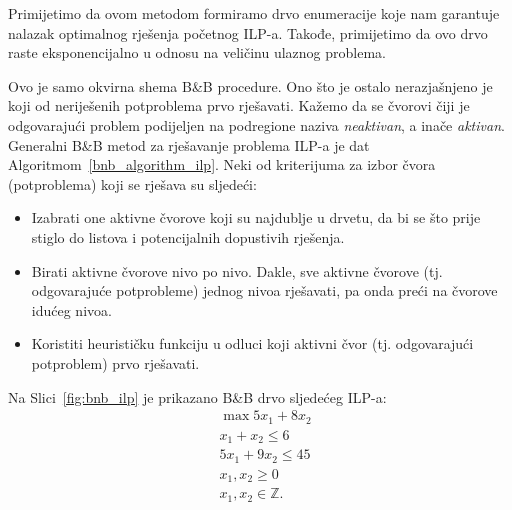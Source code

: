 \documentclass[a4paper, utf8, 11pt, colorlinks]{book}
\begin{document}
Primijetimo da ovom metodom formiramo drvo enumeracije koje nam garantuje nalazak optimalnog rješenja početnog ILP-a. Takođe, primijetimo da ovo drvo raste eksponencijalno u odnosu na veličinu ulaznog problema. 

  Ovo je samo okvirna shema B\&B procedure. Ono što je ostalo nerazjašnjeno je koji od neriješenih potproblema prvo rješavati. Kažemo da se čvorovi čiji je odgovarajući problem podijeljen na podregione naziva \emph{neaktivan}, a inače \emph{aktivan}. Generalni B\&B metod za rješavanje problema ILP-a je dat   Algoritmom~\ref{bnb_algorithm_ilp}.  Neki od kriterijuma za izbor čvora (potproblema) koji se rješava su sljedeći:
  \begin{itemize}
  	\item Izabrati one aktivne čvorove koji su najdublje u drvetu, da bi se što prije stiglo do listova i potencijalnih dopustivih rješenja.
  	\item Birati aktivne čvorove nivo po nivo. Dakle, sve aktivne čvorove (tj. odgovarajuće potprobleme) jednog nivoa   rješavati, pa onda preći na čvorove idućeg nivoa. 
  	\item Koristiti heurističku funkciju u odluci koji aktivni čvor (tj. odgovarajući potproblem) prvo rješavati. 
  \end{itemize}

Na Slici~\ref{fig:bnb_ilp} je prikazano B\&B drvo sljedećeg ILP-a:
\begin{align*}
    &\max 5 x_1 + 8 x_2 \\
    &x_1 + x_2 \leq 6 \\
    & 5 x_1 + 9 x_2 \leq 45 \\
    & x_1, x_2 \geq 0\\
    & x_1,x_2 \in \mathbb{Z}.
\end{align*}

\end{document}
